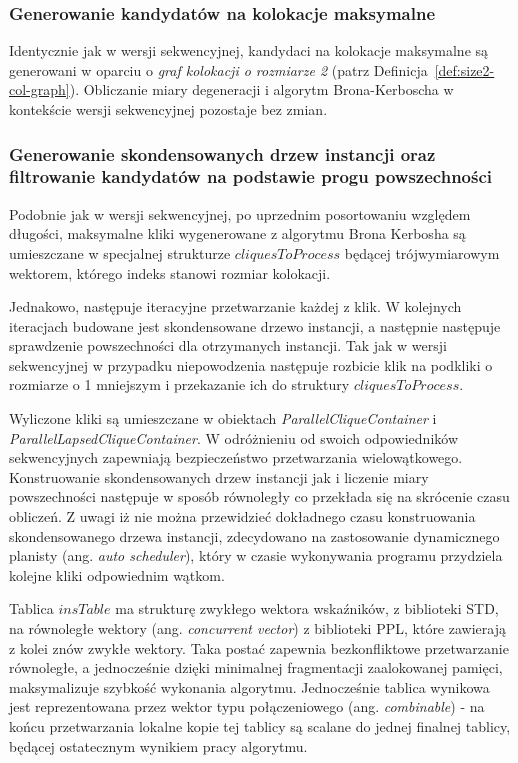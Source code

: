 \documentclass[12pt]{article}
\newcounter{algorytm}
\begin{document}
\subsubsection{Generowanie kandydatów na kolokacje maksymalne}

Identycznie jak w wersji sekwencyjnej, kandydaci na kolokacje maksymalne są generowani w oparciu o \textit{graf kolokacji o rozmiarze 2} (patrz Definicja~\ref{def:size2-col-graph}). Obliczanie miary degeneracji \cite{matusiak} i algorytm Brona-Kerboscha \cite{kerbosz} w kontekście wersji sekwencyjnej pozostaje bez zmian. 

\subsubsection{Generowanie skondensowanych drzew instancji oraz filtrowanie kandydatów na podstawie progu powszechności}

Podobnie jak w wersji sekwencyjnej, po uprzednim posortowaniu względem długości, maksymalne kliki wygenerowane z algorytmu Brona Kerbosha \cite{kerbosz} są umieszczane w specjalnej strukturze $ cliquesToProcess $ będącej trójwymiarowym wektorem, którego indeks stanowi rozmiar kolokacji. 

Jednakowo, następuje iteracyjne przetwarzanie każdej z klik. W kolejnych iteracjach budowane jest skondensowane drzewo instancji, a następnie następuje sprawdzenie powszechności dla otrzymanych instancji. Tak jak w wersji sekwencyjnej w przypadku niepowodzenia następuje rozbicie klik na podkliki o rozmiarze o 1 mniejszym i przekazanie ich do struktury $ cliquesToProcess $. 

Wyliczone kliki są umieszczane w obiektach \textit{ParallelCliqueContainer} i \textit{ParallelLapsedCliqueContainer}. W odróżnieniu od swoich odpowiedników sekwencyjnych zapewniają bezpieczeństwo przetwarzania wielowątkowego. Konstruowanie skondensowanych drzew instancji jak i liczenie miary powszechności następuje w sposób równoległy co przekłada się na skrócenie czasu obliczeń. Z uwagi iż nie można przewidzieć dokładnego czasu konstruowania skondensowanego drzewa instancji, zdecydowano na zastosowanie dynamicznego planisty (ang. \textit{auto scheduler}), który w czasie wykonywania programu przydziela kolejne kliki odpowiednim wątkom. 

Tablica $ insTable $ ma strukturę zwykłego wektora wskaźników, z biblioteki STD, na równoległe wektory (ang. \textit{concurrent vector}) z biblioteki PPL, które zawierają z kolei znów zwykłe wektory. Taka postać zapewnia bezkonfliktowe przetwarzanie równoległe, a jednocześnie dzięki minimalnej fragmentacji zaalokowanej pamięci, maksymalizuje szybkość wykonania algorytmu. Jednocześnie tablica wynikowa jest reprezentowana przez wektor typu połączeniowego (ang. \textit{combinable}) - na końcu przetwarzania lokalne kopie tej tablicy są scalane do jednej finalnej tablicy, będącej ostatecznym wynikiem pracy algorytmu. 
\end{document}
